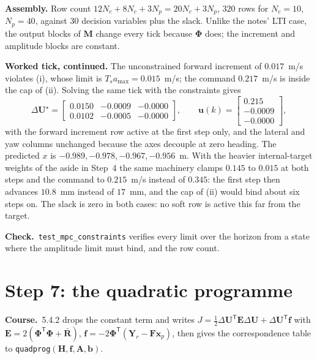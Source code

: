 \documentclass[11pt,a4paper]{article}
\newcommand{\vect}[1]{\bm{#1}}
\newcommand{\mat}[1]{\bm{#1}}
\newcommand{\T}{^{\mathsf{T}}}
\newcommand{\dU}{\Delta\vect{U}}
\newcommand{\Ts}{T_s}
\newcommand{\Np}{N_p}
\newcommand{\Nc}{N_c}
\newcommand{\Rbar}{\bar{\mat{R}}}
\newcommand{\course}{\textbf{\textcolor{blue!60!black}{Course.}}\ }
\newcommand{\tcheck}{\textbf{Check.}\ }
\begin{document}
\textbf{Assembly.} Row count $12\Nc + 8\Nc + 3\Np = 20\Nc + 3\Np$, $320$ rows for $\Nc = 10$, $\Np = 40$, against $30$ decision variables plus the slack. Unlike the notes' LTI case, the output blocks of $\mat M$ change every tick because $\mat\Phi$ does; the increment and amplitude blocks are constant.

\textbf{Worked tick, continued.} The unconstrained forward increment of $0.017$~m/s violates (i), whose limit is $\Ts a_{\max} = 0.015$~m/s; the command $0.217$~m/s is inside the cap of (ii). Solving the same tick with the constraints gives
\begin{equation}
\dU^\star = \begin{bmatrix}0.0150 & -0.0009 & -0.0000\\ 0.0102 & -0.0005 & -0.0000\end{bmatrix},\qquad
\vect u(k) = \begin{bmatrix}0.215\\ -0.0009\\ -0.0000\end{bmatrix},
\end{equation}
with the forward increment row active at the first step only, and the lateral and yaw columns unchanged because the axes decouple at zero heading. The predicted $x$ is $-0.989, -0.978, -0.967, -0.956$~m. With the heavier internal-target weights of the aside in Step~4 the same machinery clamps $0.145$ to $0.015$ at both steps and the command to $0.215$~m/s instead of $0.345$: the first step then advances $10.8$~mm instead of $17$~mm, and the cap of (ii) would bind about six steps on. The slack is zero in both cases: no soft row is active this far from the target.

\tcheck \texttt{test\_mpc\_constraints} verifies every limit over the horizon from a state where the amplitude limit must bind, and the row count.

\section{Step 7: the quadratic programme}
\course 5.4.2 drops the constant term and writes $J = \tfrac12\dU\T\mat E\dU + \dU\T\vect f$ with $\mat E = 2(\mat\Phi\T\mat\Phi + \Rbar)$, $\vect f = -2\mat\Phi\T(\vect Y_r - \mat F\vect x_p)$, then gives the correspondence table to \texttt{quadprog}$(\mat H, \vect f, \mat A, \vect b)$.
\end{document}

